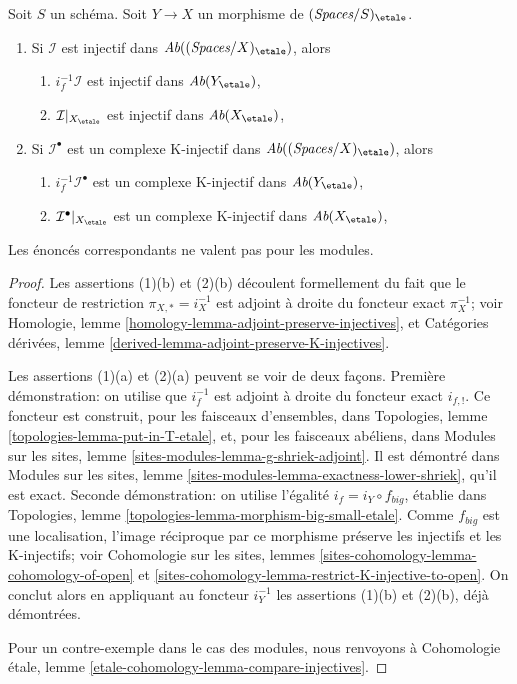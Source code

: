 \begin{lemma}
\label{lemma-compare-injectives}
Soit $S$ un schéma.
Soit $Y \to X$ un morphisme de $(\textit{Spaces}/S)_\etale$.
\begin{enumerate}
\item Si $\mathcal{I}$ est injectif dans
$\textit{Ab}((\textit{Spaces}/X)_\etale)$, alors
\begin{enumerate}
\item $i_f^{-1}\mathcal{I}$ est injectif dans $\textit{Ab}(Y_\etale)$,
\item $\mathcal{I}|_{X_\etale}$ est injectif dans $\textit{Ab}(X_\etale)$,
\end{enumerate}
\item Si $\mathcal{I}^\bullet$ est un complexe K-injectif
dans $\textit{Ab}((\textit{Spaces}/X)_\etale)$, alors
\begin{enumerate}
\item $i_f^{-1}\mathcal{I}^\bullet$ est un complexe K-injectif dans
$\textit{Ab}(Y_\etale)$,
\item $\mathcal{I}^\bullet|_{X_\etale}$ est un complexe K-injectif dans
$\textit{Ab}(X_\etale)$,
\end{enumerate}
\end{enumerate}
Les énoncés correspondants ne valent pas pour les modules.
\end{lemma}

\begin{proof}
Les assertions (1)(b) et (2)(b) découlent formellement du fait que le foncteur
de restriction $\pi_{X, *} = i_X^{-1}$ est adjoint à droite du foncteur exact
$\pi_X^{-1}$; voir Homologie, lemme
\ref{homology-lemma-adjoint-preserve-injectives}, et Catégories dérivées,
lemme \ref{derived-lemma-adjoint-preserve-K-injectives}.

\medskip\noindent
Les assertions (1)(a) et (2)(a) peuvent se voir de deux façons.
Première démonstration: on utilise que $i_f^{-1}$ est adjoint à droite du
foncteur exact $i_{f, !}$. Ce foncteur est construit, pour les faisceaux
d'ensembles, dans Topologies, lemme \ref{topologies-lemma-put-in-T-etale},
et, pour les faisceaux abéliens, dans Modules sur les sites, lemme
\ref{sites-modules-lemma-g-shriek-adjoint}. Il est démontré dans Modules sur
les sites, lemme \ref{sites-modules-lemma-exactness-lower-shriek}, qu'il est exact.
Seconde démonstration: on utilise l'égalité $i_f = i_Y \circ f_{big}$,
établie dans Topologies, lemme
\ref{topologies-lemma-morphism-big-small-etale}. Comme $f_{big}$ est une
localisation, l'image réciproque par ce morphisme préserve les injectifs et les
K-injectifs; voir Cohomologie sur les sites, lemmes
\ref{sites-cohomology-lemma-cohomology-of-open} et
\ref{sites-cohomology-lemma-restrict-K-injective-to-open}.
On conclut alors en appliquant au foncteur $i_Y^{-1}$ les assertions (1)(b)
et (2)(b), déjà démontrées.

\medskip\noindent
Pour un contre-exemple dans le cas des modules, nous renvoyons à
Cohomologie étale, lemme \ref{etale-cohomology-lemma-compare-injectives}.
\end{proof}

